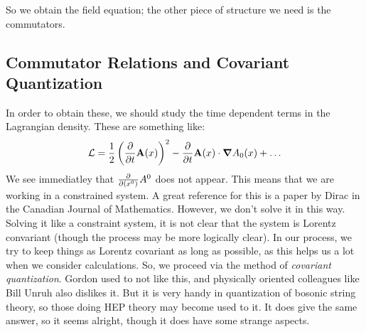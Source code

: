 So we obtain the field equation; the other piece of structure we need is the commutators.

\subsection{Commutator Relations and Covariant Quantization}
In order to obtain these, we should study the time dependent terms in the Lagrangian density. These are something like:
\begin{equation}
    \L = \frac{1}{2}\left(\dpd{}{t}\v{A}(x)\right)^2 - \dpd{}{t}\v{A}(x) \cdot \nabla A_0(x) + \ldots
\end{equation}
We see immediatley that $\pd{}{(x^0)}A^0$ does not appear. This means that we are working in a constrained system. A great reference for this is a paper by Dirac in the Canadian Journal of Mathematics. However, we don't solve it in this way. Solving it like a constraint system, it is not clear that the system is Lorentz convariant (though the process may be more logically clear). In our process, we try to keep things as Lorentz covariant as long as possible, as this helps us a lot when we consider calculations. So, we proceed via the method of \emph{covariant quantization}. Gordon used to not like this, and physically oriented colleagues like Bill Unruh also dislikes it. But it is very handy in quantization of bosonic string theory, so those doing HEP theory may become used to it. It does give the same answer, so it seems alright, though it does have some strange aspects.

